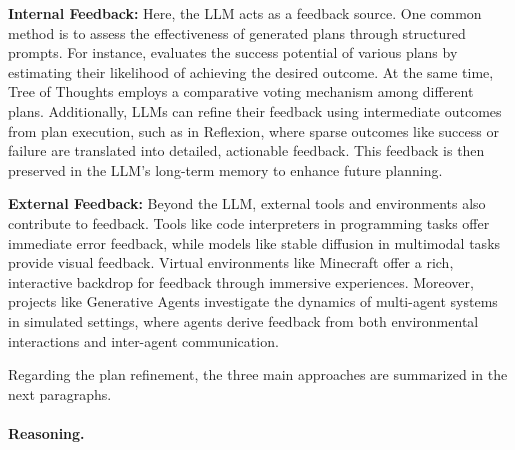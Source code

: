 \textbf{Internal Feedback:} Here, the LLM acts as a feedback source.
One common method is to assess the effectiveness of generated plans through structured prompts.
For instance, \textcite{hao2023reasoning} evaluates the success potential of various plans by estimating their likelihood of achieving the desired outcome.
At the same time, Tree of Thoughts employs a comparative voting mechanism among different plans.
Additionally, LLMs can refine their feedback using intermediate outcomes from plan execution, such as in Reflexion, where sparse outcomes like success or failure are translated into detailed, actionable feedback.
This feedback is then preserved in the LLM’s long-term memory to enhance future planning.

\textbf{External Feedback:} Beyond the LLM, external tools and environments also contribute to feedback.
Tools like code interpreters in programming tasks offer immediate error feedback, while models like stable diffusion in multimodal tasks provide visual feedback.
Virtual environments like Minecraft offer a rich, interactive backdrop for feedback through immersive experiences.
Moreover, projects like Generative Agents investigate the dynamics of multi-agent systems in simulated settings, where agents derive feedback from both environmental interactions and inter-agent communication.

Regarding the plan refinement, the three main approaches are summarized in the next paragraphs.

\paragraph{Reasoning.}
\label{par:reasoning}


